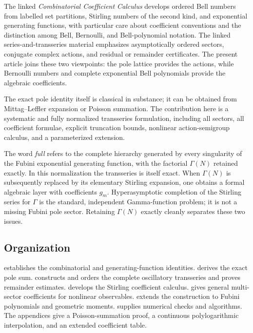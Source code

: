 \documentclass[11pt,oneside]{article}
\numberwithin{equation}{section}
\begin{document}
The linked \emph{Combinatorial Coefficient Calculus} develops ordered Bell numbers from labelled set partitions, Stirling numbers of the second kind, and exponential generating functions, with particular care about coefficient conventions and the distinction among Bell, Bernoulli, and Bell-polynomial notation.  The linked series-and-transseries material emphasizes asymptotically ordered sectors, conjugate complex actions, and residual or remainder certificates.  The present article joins these two viewpoints: the pole lattice provides the actions, while Bernoulli numbers and complete exponential Bell polynomials provide the algebraic coefficients.

The exact pole identity itself is classical in substance; it can be obtained from Mittag--Leffler expansion or Poisson summation.  The contribution here is a systematic and fully normalized transseries formulation, including all sectors, all coefficient formulae, explicit truncation bounds, nonlinear action-semigroup calculus, and a parameterized extension.

\begin{auditbox}
The word \emph{full} refers to the complete hierarchy generated by every singularity of the Fubini exponential generating function, with the factorial \(\Gamma(N)\) retained exactly.  In this normalization the transseries is itself exact.  When \(\Gamma(N)\) is subsequently replaced by its elementary Stirling expansion, one obtains a formal algebraic layer with coefficients \(g_m\).  Hyperasymptotic completion of the Stirling series for \(\Gamma\) is the standard, independent Gamma-function problem; it is not a missing Fubini pole sector.  Retaining \(\Gamma(N)\) exactly cleanly separates these two issues.
\end{auditbox}

\subsection{Organization}

 establishes the combinatorial and generating-function identities.   derives the exact pole sum.   constructs and orders the complete oscillatory transseries and proves remainder estimates.   develops the Stirling coefficient calculus.   gives general multi-sector coefficients for nonlinear observables.   extends the construction to Fubini polynomials and geometric moments.   supplies numerical checks and algorithms.  The appendices give a Poisson-summation proof, a continuous polylogarithmic interpolation, and an extended coefficient table.
\end{document}

